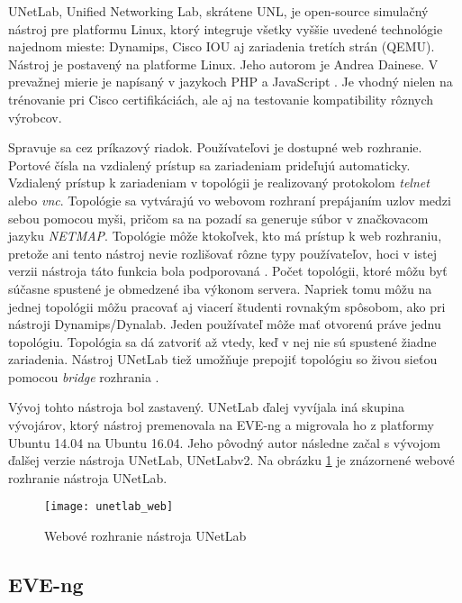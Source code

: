 UNetLab, Unified Networking Lab, skrátene UNL, je open-source  simulačný nástroj pre platformu Linux, ktorý integruje všetky vyššie uvedené technológie najednom mieste: Dynamips, Cisco IOU aj zariadenia tretích strán (QEMU). Nástroj je postavený na platforme Linux. Jeho autorom je Andrea Dainese. V prevažnej mierie je napísaný v jazykoch PHP a JavaScript \cite{webiou_unetlab_unetlabv2, unetlab_github}. Je vhodný nielen na trénovanie pri Cisco certifikáciách, ale aj na testovanie kompatibility rôznych výrobcov.

Spravuje sa cez príkazový riadok. Používateľovi je dostupné web rozhranie. Portové čísla na vzdialený prístup sa zariadeniam prideľujú automaticky. Vzdialený prístup k zariadeniam v topológii je realizovaný protokolom \emph{telnet} alebo \emph{vnc}. Topológie sa vytvárajú vo webovom rozhraní prepájaním uzlov medzi sebou pomocou myši, pričom sa na pozadí sa generuje súbor v značkovacom jazyku \emph{NETMAP}. Topológie môže ktokoľvek, kto má prístup k web rozhraniu, pretože ani tento nástroj nevie rozlišovať rôzne typy používateľov, hoci v istej verzii nástroja táto funkcia bola podporovaná \cite{unetlab_github}. Počet topológii, ktoré môžu byť súčasne spustené je obmedzené iba výkonom servera. Napriek tomu môžu na jednej topológii môžu pracovať aj viacerí študenti rovnakým spôsobom, ako pri nástroji Dynamips/Dynalab. Jeden používateľ môže mať otvorenú práve jednu topológiu. Topológia sa dá zatvoriť až vtedy, keď v nej nie sú spustené žiadne zariadenia. Nástroj UNetLab tiež umožňuje prepojiť topológiu so živou sieťou pomocou \emph{bridge} rozhrania \cite{webiou_real_network}.

Vývoj tohto nástroja bol zastavený. UNetLab ďalej vyvíjala iná skupina vývojárov, ktorý nástroj premenovala na EVE-ng a migrovala ho z platformy Ubuntu 14.04 na Ubuntu 16.04. Jeho pôvodný autor následne začal s vývojom ďalšej verzie nástroja UNetLab, UNetLabv2. Na obrázku \ref{obr:unetlab_web} je znázornené webové rozhranie nástroja UNetLab.

\begin{figure}
    \centering
    \texttt{[image: unetlab\_web]}
    \caption{Webové rozhranie nástroja UNetLab}
    \cite{obr_unetlab_web}
    \label{obr:unetlab_web}
\end{figure}

\subsection{EVE-ng}
\label{chap:virt_lab_eve_ng}

